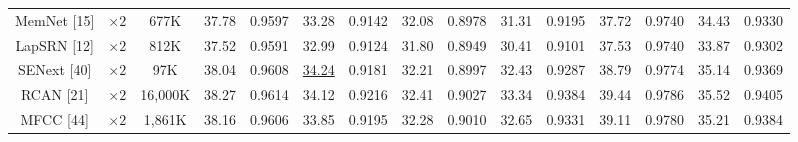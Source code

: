 \documentclass[twocolumn]{svjour3}          %
\begin{document}
\begin{table}
\begin{tabular}{|c|c|c|cc|cc|cc|cc|cc|cc|}
MemNet [15] & $\times 2$&677K& \multicolumn{1}{c|}{37.78} & 0.9597  & \multicolumn{1}{c|}{33.28} &0.9142  &\multicolumn{1}{c|}{32.08} & 0.8978 & \multicolumn{1}{c|}{31.31} &0.9195  & \multicolumn{1}{c|}{37.72} &0.9740
&\multicolumn{1}{c|}{34.43} &0.9330\\

LapSRN [12] & $\times 2$&812K& \multicolumn{1}{c|}{37.52} & 0.9591 & \multicolumn{1}{c|}{32.99} & 0.9124 &\multicolumn{1}{c|}{31.80} & 0.8949 & \multicolumn{1}{c|}{30.41} &  0.9101 & \multicolumn{1}{c|}{37.53} &  0.9740
&\multicolumn{1}{c|}{33.87} & 0.9302\\

SENext [40] & $\times 2$ &97K& \multicolumn{1}{c|}{38.04} & {0.9608} & \multicolumn{1}{c|}{\color{blue}\underline{34.24}} &{ 0.9181} & \multicolumn{1}{c|}{32.21} & {0.8997}& \multicolumn{1}{c|}{32.43} &{0.9287}& \multicolumn{1}{c|}{38.79} &{0.9774} &\multicolumn{1}{c|}{35.14} & {0.9369}\\



RCAN [21]& $\times 2$&16,000K& \multicolumn{1}{c|}{38.27} & 0.9614 & \multicolumn{1}{c|}{34.12} & 0.9216 &\multicolumn{1}{c|}{32.41} & 0.9027& \multicolumn{1}{c|}{33.34} & 0.9384 & \multicolumn{1}{c|}{39.44} & 0.9786
&\multicolumn{1}{c|}{35.52} & 0.9405\\


MFCC [44]& $\times 2$&1,861K& \multicolumn{1}{c|}{38.16} & 0.9606 & \multicolumn{1}{c|}{33.85} &0.9195 &\multicolumn{1}{c|}{32.28} & 0.9010& \multicolumn{1}{c|}{32.65} &0.9331 & \multicolumn{1}{c|}{39.11} & 0.9780
&\multicolumn{1}{c|}{35.21} & 0.9384\\



\end{tabular}
\end{table}
\end{document}
